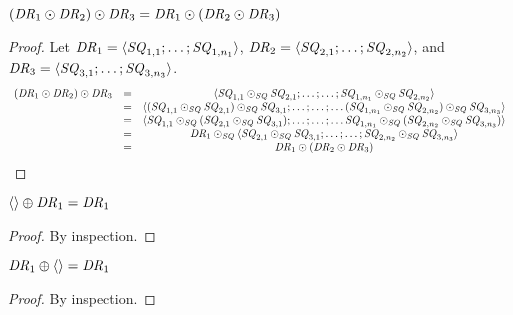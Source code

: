 \documentclass[numbers,10pt,preprint\ifanon ,nocopyrightspace\fi]{sigplanconf}
\begin{document}
\begin{lemma}
  \label{lem:dnf-concat-assoc}
  $(\mathit{DR}_1 \odot \mathit{DR}_2) \odot \mathit{DR}_3 =
  \mathit{DR}_1 \odot (\mathit{DR}_2 \odot \mathit{DR}_3)$
\end{lemma}
\begin{proof}
  Let $\mathit{DR}_1 = \langle\mathit{SQ}_{1,1};\ldots;\mathit{SQ}_{1,n_1}\rangle$,
  $\mathit{DR}_2 = \langle\mathit{SQ}_{2,1};\ldots;\mathit{SQ}_{2,n_2}\rangle$, and
  $\mathit{DR}_3 = \langle\mathit{SQ}_{3,1};\ldots;\mathit{SQ}_{3,n_3}\rangle$.
  \[
    \begin{array}{ccc}
      (\mathit{DR}_1 \odot \mathit{DR}_2) \odot \mathit{DR}_3
      & = & \langle\mathit{SQ}_{1,1}\odot_{\mathit{SQ}}\mathit{SQ}_{2,1};
            \ldots;\ldots;\mathit{SQ}_{1,n_1}\odot_{\mathit{SQ}}\mathit{SQ}_{2,n_2}\rangle\\
      & = &
            \langle(\mathit{SQ}_{1,1}\odot_{\mathit{SQ}}\mathit{SQ}_{2,1})\odot_{\mathit{SQ}}\mathit{SQ}_{3,1};
            \ldots;\ldots;\ldots
            (\mathit{SQ}_{1,n_1}\odot_{\mathit{SQ}}\mathit{SQ}_{2,n_2})\odot_{\mathit{SQ}}\mathit{SQ}_{3,n_3}\rangle\\
      & = &
            \langle\mathit{SQ}_{1,1}\odot_{\mathit{SQ}}(\mathit{SQ}_{2,1}\odot_{\mathit{SQ}}\mathit{SQ}_{3,1});
            \ldots;\ldots;\ldots
            \mathit{SQ}_{1,n_1}\odot_{\mathit{SQ}}(\mathit{SQ}_{2,n_2}\odot_{\mathit{SQ}}\mathit{SQ}_{3,n_3})\rangle\\
      & = &
            \mathit{DR}_1 \odot_{\mathit{SQ}}
            \langle\mathit{SQ}_{2,1}\odot_{\mathit{SQ}}\mathit{SQ}_{3,1};
            \ldots;\ldots;\mathit{SQ}_{2,n_2}\odot_{\mathit{SQ}}\mathit{SQ}_{3,n_3}\rangle\\
      & = &
            \mathit{DR}_1 \odot (\mathit{DR}_2 \odot \mathit{DR}_3)
    \end{array}
  \]
\end{proof}

\begin{lemma}
  \label{lem:dnf-or-identity-left}
  $\langle\rangle \oplus \mathit{DR}_1 = \mathit{DR}_1$
\end{lemma}
\begin{proof}
  By inspection.
\end{proof}

\begin{lemma}
  \label{lem:dnf-or-identity-right}
  $\mathit{DR}_1 \oplus \langle\rangle = \mathit{DR}_1$
\end{lemma}
\begin{proof}
  By inspection.
\end{proof}
\end{document}
